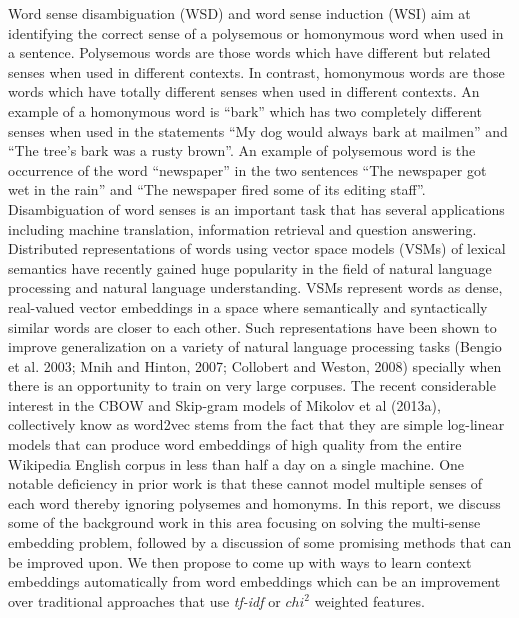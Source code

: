 \documentclass{article}
\begin{document}
Word sense disambiguation (WSD) and word sense induction (WSI) aim at identifying the correct sense of a polysemous or homonymous word when used in a sentence. Polysemous words are those words which have different but related senses when used in different contexts. In contrast, homonymous words are those words which have totally different senses when used in different contexts. An example of a homonymous word is “bark” which has two completely different senses when used in the statements “My dog would always bark at mailmen” and “The tree’s bark was a rusty brown”. An example of polysemous word is the occurrence of the word “newspaper” in the two sentences “The newspaper got wet in the rain” and “The newspaper fired some of its editing staff”. Disambiguation of word senses is an important task that has several applications including machine translation, information retrieval and question answering.\\
Distributed representations of words using vector space models (VSMs) of lexical semantics have recently gained huge popularity in the field of natural language processing and natural language understanding. VSMs represent words as dense, real-valued vector embeddings in a space where semantically and syntactically similar words are closer to each other. Such representations have been shown to improve generalization on a variety of natural language processing tasks (Bengio et al. 2003; Mnih and Hinton, 2007; Collobert and Weston, 2008) specially when there is an opportunity to train on very large corpuses. The recent considerable interest in the CBOW and Skip-gram models of Mikolov et al (2013a), collectively know as word2vec stems from the fact that they are simple log-linear models that can produce word embeddings of high quality from the entire Wikipedia English corpus in less than half a day on a single machine. One notable deficiency in prior work is that these cannot model multiple senses of each word thereby ignoring polysemes and homonyms. In this report, we discuss some of the background work in this area focusing on solving the multi-sense embedding problem, followed by a discussion of some promising methods that can be improved upon. We then propose to come up with ways to learn context embeddings automatically from word embeddings which can be an improvement over traditional approaches that use \textit{tf-idf} or $chi^2$ weighted features. 
\end{document}

